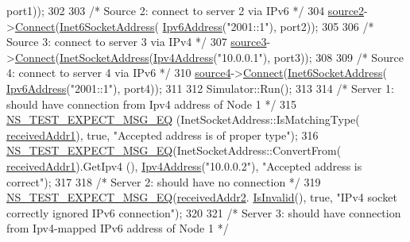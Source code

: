 \begin{DoxyCode}
      port1));
302 
303   \textcolor{comment}{/* Source 2: connect to server 2 via IPv6 */}
304   \hyperlink{classDualStackTestCase_a61fd1d32c28557623bf74535044693bb}{source2}->\hyperlink{classns3_1_1Socket_a97f08aaf37b8fd7d4b5cad4dfdd4022a}{Connect}(\hyperlink{classns3_1_1Inet6SocketAddress}{Inet6SocketAddress}(
      \hyperlink{classns3_1_1Ipv6Address}{Ipv6Address}(\textcolor{stringliteral}{"2001::1"}), port2));
305 
306   \textcolor{comment}{/* Source 3: connect to server 3 via IPv4 */}
307   \hyperlink{classDualStackTestCase_ab7b8bea54582bc0ce4864dc184348813}{source3}->\hyperlink{classns3_1_1Socket_a97f08aaf37b8fd7d4b5cad4dfdd4022a}{Connect}(\hyperlink{classns3_1_1InetSocketAddress}{InetSocketAddress}(\hyperlink{classns3_1_1Ipv4Address}{Ipv4Address}(\textcolor{stringliteral}{"10.0.0.1"}), 
      port3));
308 
309   \textcolor{comment}{/* Source 4: connect to server 4 via IPv6 */}
310   \hyperlink{classDualStackTestCase_af8c2e51627dab5f1189b9339c68aa248}{source4}->\hyperlink{classns3_1_1Socket_a97f08aaf37b8fd7d4b5cad4dfdd4022a}{Connect}(\hyperlink{classns3_1_1Inet6SocketAddress}{Inet6SocketAddress}(
      \hyperlink{classns3_1_1Ipv6Address}{Ipv6Address}(\textcolor{stringliteral}{"2001::1"}), port4));
311 
312   Simulator::Run();
313 
314   \textcolor{comment}{/* Server 1: should have connection from Ipv4 address of Node 1 */}
315   \hyperlink{group__testing_ga7304ba46a28d8cf08dfdfd6499cf7068}{NS\_TEST\_EXPECT\_MSG\_EQ} (InetSocketAddress::IsMatchingType(
      \hyperlink{classDualStackTestCase_a852709037ee51bac771d4779613aae52}{receivedAddr1}), \textcolor{keyword}{true}, \textcolor{stringliteral}{"Accepted address is of proper type"});
316   \hyperlink{group__testing_ga7304ba46a28d8cf08dfdfd6499cf7068}{NS\_TEST\_EXPECT\_MSG\_EQ}(InetSocketAddress::ConvertFrom(
      \hyperlink{classDualStackTestCase_a852709037ee51bac771d4779613aae52}{receivedAddr1}).GetIpv4 (), \hyperlink{classns3_1_1Ipv4Address}{Ipv4Address}(\textcolor{stringliteral}{"10.0.0.2"}), \textcolor{stringliteral}{"Accepted address is correct"});
317 
318   \textcolor{comment}{/* Server 2: should have no connection */}
319   \hyperlink{group__testing_ga7304ba46a28d8cf08dfdfd6499cf7068}{NS\_TEST\_EXPECT\_MSG\_EQ}(\hyperlink{classDualStackTestCase_a63218de46662d966207fcc8d978be471}{receivedAddr2}.
      \hyperlink{classns3_1_1Address_adfefe8eeb274514e4f171f4068f7e882}{IsInvalid}(), \textcolor{keyword}{true}, \textcolor{stringliteral}{"IPv4 socket correctly ignored IPv6 connection"});
320 
321   \textcolor{comment}{/* Server 3: should have connection from Ipv4-mapped IPv6 address of Node 1 */}

\end{DoxyCode}
